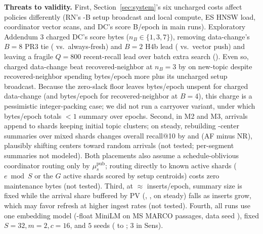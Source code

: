 \textbf{Threats to validity.} First, Section~\ref{sec:system}'s six uncharged costs affect policies differently (RN's \RNumRNSetupBroadcastBytes{}-B setup broadcast and local compute, ES HNSW load, coordinator vector scans, and DC's \RNumDCScoreEpochBytes{} score B/epoch in main runs). Exploratory Addendum 3 charged DC's score bytes ($n_B \in \{1, 3, 7\}$), removing data-change's $B{=}8$ PR3 tie (\RNumAddThreeXThreeDCBEightNewTopic{} vs.\ always-fresh) and $B{=}2$ H4b lead (\RNumAddThreeXTwoPVBTwoNewTopic{} vs.\ vector push) and leaving a fragile $Q{=}800$ recent-recall lead over batch extra search (\RNumAddThreeXFourESNewTopic{}). Even so, charged data-change beat recovered-neighbor at $n_B{=}3$ by \RNumAddThreeXOneRNBFourNewTopic{} on new-topic despite recovered-neighbor spending \RNumAddThreeRNExtraEpochBytesVsChargedDC{} bytes/epoch more plus its uncharged setup broadcast. Because the zero-slack floor leaves \RNumAddThreeDCUnspentEpochBytes{} bytes/epoch unspent for charged data-change (and \RNumRNStrandedEpochBytesBFour{} bytes/epoch for recovered-neighbor at $B{=}4$), this charge is a pessimistic integer-packing case; we did not run a carryover variant, under which \RNumDCScoreEpochBytes{} bytes/epoch totals $< 1$ summary over \RNumNumEpochs{} epochs. Second, in M2 and M3, arrivals append to shards keeping initial topic clusters; on steady, rebuilding \RNumCentersPerSummary{}-center summaries over mixed shards changes overall recall@10 by \RNumGateMTwoOverallSteady{} and \RNumGateMThreeOverallSteady{} (AF minus NR), plausibly shifting centers toward random arrivals (not tested; per-segment summaries not modeled). Both placements also assume a schedule-oblivious coordinator routing only by $\mu_s^{\text{pub}}$; routing directly to known active shards ($e \bmod S$ or the $G$ active shards scored by setup centroids) costs zero maintenance bytes (not tested). Third, at $\approx {}$\RNumSteadyEpochInsertVecs{} inserts/epoch, summary size is fixed while the arrival share buffered by PV (\RNumMTwoPVShareBTwo{}, \RNumMTwoPVShareBFour{}, \RNumMTwoPVShareBEight{} on steady) falls as inserts grow, which may favor refresh at higher ingest rates (not tested). Fourth, all runs use one embedding model (\RNumVectorDimFloats{}-float MiniLM on \RNumCorpusTotalPassages{} MS MARCO passages, data seed \RNumDataSeed{}), fixed $S{=}32, m{=}2, c{=}16$, and $5$ seeds (\RNumSeedMin{} to \RNumSeedMax{}; $3$ in Sens).
